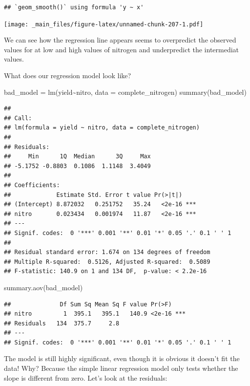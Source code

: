 \documentclass[
]{book}
\newenvironment{Shaded}{\begin{snugshade}}{\end{snugshade}}
\newcommand{\AttributeTok}[1]{\textcolor[rgb]{0.77,0.63,0.00}{#1}}
\newcommand{\FunctionTok}[1]{\textcolor[rgb]{0.00,0.00,0.00}{#1}}
\newcommand{\NormalTok}[1]{#1}
\newcommand{\OtherTok}[1]{\textcolor[rgb]{0.56,0.35,0.01}{#1}}
\newcommand{\SpecialCharTok}[1]{\textcolor[rgb]{0.00,0.00,0.00}{#1}}
\begin{document}
\begin{verbatim}
## `geom_smooth()` using formula 'y ~ x'
\end{verbatim}

\texttt{[image: \_main\_files/figure-latex/unnamed-chunk-207-1.pdf]}

We can see how the regression line appears seems to overpredict the observed values for at low and high values of nitrogen and underpredict the intermediat values.

What does our regression model look like?

\begin{Shaded}
\begin{Highlighting}[]
\NormalTok{bad\_model }\OtherTok{=} \FunctionTok{lm}\NormalTok{(yield}\SpecialCharTok{\textasciitilde{}}\NormalTok{nitro, }\AttributeTok{data =}\NormalTok{ complete\_nitrogen)}
\FunctionTok{summary}\NormalTok{(bad\_model)}
\end{Highlighting}
\end{Shaded}

\begin{verbatim}
## 
## Call:
## lm(formula = yield ~ nitro, data = complete_nitrogen)
## 
## Residuals:
##     Min      1Q  Median      3Q     Max 
## -5.1752 -0.8803  0.1086  1.1148  3.4049 
## 
## Coefficients:
##             Estimate Std. Error t value Pr(>|t|)    
## (Intercept) 8.872032   0.251752   35.24   <2e-16 ***
## nitro       0.023434   0.001974   11.87   <2e-16 ***
## ---
## Signif. codes:  0 '***' 0.001 '**' 0.01 '*' 0.05 '.' 0.1 ' ' 1
## 
## Residual standard error: 1.674 on 134 degrees of freedom
## Multiple R-squared:  0.5126, Adjusted R-squared:  0.5089 
## F-statistic: 140.9 on 1 and 134 DF,  p-value: < 2.2e-16
\end{verbatim}

\begin{Shaded}
\begin{Highlighting}[]
\FunctionTok{summary.aov}\NormalTok{(bad\_model)}
\end{Highlighting}
\end{Shaded}

\begin{verbatim}
##              Df Sum Sq Mean Sq F value Pr(>F)    
## nitro         1  395.1   395.1   140.9 <2e-16 ***
## Residuals   134  375.7     2.8                   
## ---
## Signif. codes:  0 '***' 0.001 '**' 0.01 '*' 0.05 '.' 0.1 ' ' 1
\end{verbatim}

The model is still highly significant, even though it is obvious it doesn't fit the data! Why? Because the simple linear regression model only tests whether the slope is different from zero. Let's look at the residuals:
\end{document}
